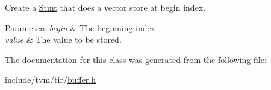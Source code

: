 Create a \hyperlink{classtvm_1_1tir_1_1Stmt}{Stmt} that does a vector store at begin index. 


\begin{DoxyParams}{Parameters}
{\em begin} & The beginning index \\
\hline
{\em value} & The value to be stored. \\
\hline
\end{DoxyParams}


The documentation for this class was generated from the following file\+:\begin{DoxyCompactItemize}
\item 
include/tvm/tir/\hyperlink{buffer_8h}{buffer.\+h}\end{DoxyCompactItemize}
